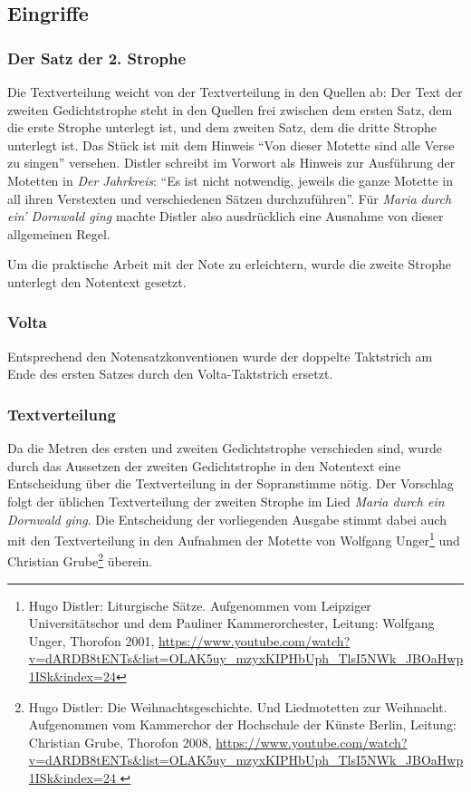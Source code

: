 \documentclass[a4paper]{book}
\begin{document}
\begin{multicols}{2}
\subsection{Eingriffe}

\subsubsection{Der Satz der 2. Strophe}

Die Textverteilung weicht von der Textverteilung in den Quellen ab: Der
Text der zweiten Gedichtstrophe steht in den Quellen frei zwischen dem
ersten Satz, dem die erste Strophe unterlegt ist, und dem zweiten Satz,
dem die dritte Strophe unterlegt ist. Das Stück ist mit dem Hinweis
``Von dieser Motette sind alle Verse zu singen'' versehen. Distler
schreibt im Vorwort als Hinweis zur Ausführung der Motetten in \emph{Der
Jahrkreis}: ``Es ist nicht notwendig, jeweils die ganze Motette in all
ihren Verstexten und verschiedenen Sätzen durchzuführen''. Für
\emph{Maria durch ein' Dornwald ging} machte Distler also ausdrücklich
eine Ausnahme von dieser allgemeinen Regel.

Um die praktische Arbeit mit der Note zu erleichtern, wurde die zweite
Strophe unterlegt den Notentext gesetzt.

\subsubsection{Volta}

Entsprechend den Notensatzkonventionen wurde der doppelte Taktstrich am
Ende des ersten Satzes durch den Volta-Taktstrich ersetzt.

\subsubsection{Textverteilung}

Da die Metren des ersten und zweiten Gedichtstrophe verschieden sind,
wurde durch das Aussetzen der zweiten Gedichtstrophe in den Notentext
eine Entscheidung über die Textverteilung in der Sopranstimme nötig. Der
Vorschlag folgt der üblichen Textverteilung der zweiten Strophe im Lied
\emph{Maria durch ein Dornwald ging}. Die Entscheidung der vorliegenden
Ausgabe stimmt dabei auch mit den Textverteilung in den Aufnahmen der
Motette von Wolfgang Unger\footnote{Hugo Distler: Liturgische Sätze.
  Aufgenommen vom Leipziger Universitätschor und dem Pauliner
  Kammerorchester, Leitung: Wolfgang Unger, Thorofon 2001,
  \url{https://www.youtube.com/watch?v=dARDB8tENTs\&list=OLAK5uy\_mzyxKIPHbUph\_TlsI5NWk\_JBOaHwp1ISk\&index=24}}
und Christian Grube\footnote{Hugo Distler: Die Weihnachtsgeschichte. Und
  Liedmotetten zur Weihnacht. Aufgenommen vom Kammerchor der Hochschule
  der Künste Berlin, Leitung: Christian Grube, Thorofon 2008,
  \url{https://www.youtube.com/watch?v=dARDB8tENTs\&list=OLAK5uy\_mzyxKIPHbUph\_TlsI5NWk\_JBOaHwp1ISk\&index=24 }}
überein.


\end{multicols}
\end{document}

